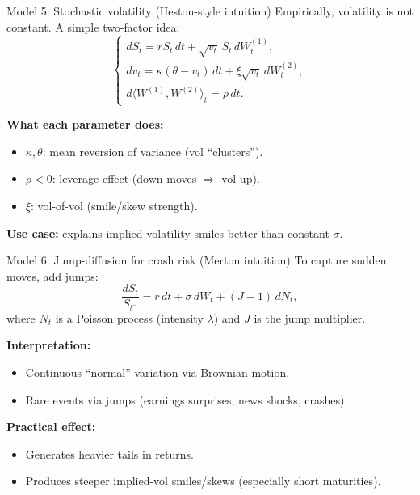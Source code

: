 \documentclass[10pt,aspectratio=169]{beamer}
\begin{document}
\begin{frame}{Model 5: Stochastic volatility (Heston-style intuition)}
Empirically, volatility is not constant. A simple two-factor idea:
\[
\begin{cases}
dS_t = r S_t\,dt + \sqrt{v_t}\,S_t\, dW_t^{(1)},\\
dv_t = \kappa(\theta-v_t)\,dt + \xi\sqrt{v_t}\, dW_t^{(2)},\\
d\langle W^{(1)},W^{(2)}\rangle_t = \rho\,dt.
\end{cases}
\]

\medskip
\textbf{What each parameter does:}
\begin{itemize}
  \item $\kappa,\theta$: mean reversion of variance (vol ``clusters'').
  \item $\rho<0$: leverage effect (down moves $\Rightarrow$ vol up).
  \item $\xi$: vol-of-vol (smile/skew strength).
\end{itemize}

\medskip
\textbf{Use case:} explains implied-volatility smiles better than constant-$\sigma$.
\end{frame}

\begin{frame}{Model 6: Jump-diffusion for crash risk (Merton intuition)}
To capture sudden moves, add jumps:
\[
\frac{dS_t}{S_{t^-}} = r\,dt + \sigma\, dW_t + (J-1)\, dN_t,
\]
where $N_t$ is a Poisson process (intensity $\lambda$) and $J$ is the jump multiplier.

\medskip
\textbf{Interpretation:}
\begin{itemize}
  \item Continuous ``normal'' variation via Brownian motion.
  \item Rare events via jumps (earnings surprises, news shocks, crashes).
\end{itemize}

\medskip
\textbf{Practical effect:}
\begin{itemize}
  \item Generates heavier tails in returns.
  \item Produces steeper implied-vol smiles/skews (especially short maturities).
\end{itemize}
\end{frame}
\end{document}

